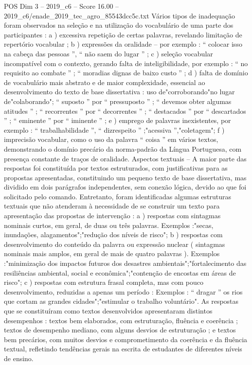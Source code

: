 \begin{textsample}{POS Dim 3 – 2019\_c6 – Score 16.00 – 2019\_c6/enade\_2019\_tec\_agro\_85543dcc5c.txt}
Vários tipos de inadequação foram observados na seleção e na utilização do vocabulário de uma parte dos participantes : a ) excessiva repetição de certas palavras, revelando limitação de repertório vocabular ; b ) expressões da oralidade – por exemplo : “ colocar isso na cabeça das pessoas ”, “ não saem do lugar ” ; c ) seleção vocabular incompatível com o contexto, gerando falta de inteligibilidade, por exemplo : “ no requisito ao combate ” ; “ moradias dignas de baixo custo ” ; d ) falta de domínio de vocabulário mais abstrato e de maior complexidade, essencial ao desenvolvimento do texto de base dissertativa : uso de"corroborando"no lugar de"colaborando"; “ suposto ” por “ pressuposto ” ; “ devemos obter algumas atitudes ” ; “ recorrentes ” por “ decorrentes ” ; “ destacados ” por “ descartados ” ; “ eminente ” por “ iminente ” ; e ) emprego de palavras inexistentes, por exemplo : “ trabalhabilidade ”, “ dizrespeito ” ;"acessiva ”,"coletagem"; f ) imprecisão vocabular, como o uso da palavra “ coisa ” em vários textos, demonstrando o domínio precário da norma-padrão da Língua Portuguesa, com presença constante de traços de oralidade.
Aspectos textuais – A maior parte das respostas foi constituída por textos estruturados, com justificativas para as propostas apresentadas, constituindo um pequeno texto de base dissertativa, mas dividido em dois parágrafos independentes, sem conexão lógica, devido ao que foi solicitado pelo comando.
Entretanto, foram identificadas algumas estruturas textuais que não atenderam à necessidade de se construir um texto para apresentação das propostas de intervenção : a ) respostas com sintagmas nominais curtos, em geral, de duas ou três palavras.
Exemplos :"secas, inundações, alagamentos";"redução dos níveis de risco"; b ) respostas com desenvolvimento do conteúdo da palavra ou expressão nuclear ( sintagmas nominais mais amplos, em geral de mais de quatro palavras ).
Exemplos :"minimização dos impactos futuros dos desastres ambientais";"fortalecimento das resiliências ambiental, social e econômica";"contenção de encostas em áreas de risco"; c ) respostas com estrutura frasal completa, mas com pouco desenvolvimento, reduzidas a apenas um período : Exemplos : “ dragar ” os rios que cortam as grandes cidades";"estimular o trabalho voluntário".
As respostas que se constituíram como textos desenvolvidos apresentaram distintos desempenhos : textos bem elaborados, com estruturação, fluência e coerência ; textos de desempenho mediano, com alguns desvios de estruturação ; e textos bem precários, com muitos desvios e comprometimento da coerência e da fluência textual, refletindo tendências gerais na escrita de estudantes de diferentes níveis de ensino.

\end{textsample}
